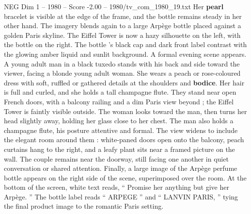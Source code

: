 \begin{textsample}{NEG Dim 1 – 1980 – Score -2.00 – 1980/tv\_com\_1980\_19.txt}
Her \textbf{pearl} bracelet is visible at the edge of the frame, and the bottle remains steady in her other hand.
The imagery blends again to a large Arpège bottle placed against a golden Paris skyline.
The Eiffel Tower is now a hazy silhouette on the left, with the bottle on the right.
The bottle ’s black cap and dark front label contrast with the glowing amber liquid and sunlit background.
A formal evening scene appears.
A young adult man in a black tuxedo stands with his back and side toward the viewer, facing a blonde young adult woman.
She wears a peach or rose-coloured dress with soft, ruffled or gathered details at the shoulders and \textbf{bodice}.
Her hair is full and curled, and she holds a tall champagne flute.
They stand near open French doors, with a balcony railing and a dim Paris view beyond ; the Eiffel Tower is faintly visible outside.
The woman looks toward the man, then turns her head slightly away, holding her glass close to her chest.
The man also holds a champagne flute, his posture attentive and formal.
The view widens to include the elegant room around them : white-paned doors open onto the balcony, peach curtains hang to the right, and a leafy plant sits near a framed picture on the wall.
The couple remains near the doorway, still facing one another in quiet conversation or shared attention.
Finally, a large image of the Arpège perfume bottle appears on the right side of the scene, superimposed over the room.
At the bottom of the screen, white text reads, “ Promise her anything but give her Arpège. ” The bottle label reads “ ARPEGE ” and “ LANVIN PARIS, ” tying the final product image to the romantic Paris setting.

\end{textsample}
